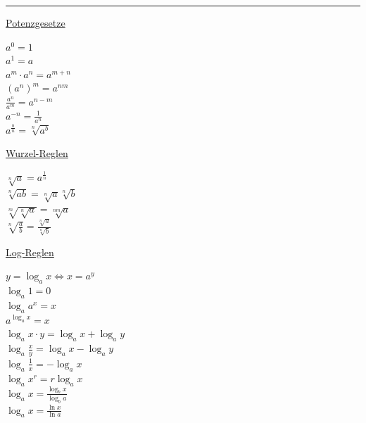 \documentclass[6pt]{article}
\begin{document}
\begin{multicols*}{2}
	\vspace{3mm}
  	\noindent\textcolor{gray}{\rule{14cm}{0.1pt}}
	\vspace{-4mm}
	
\begin{multicols*}{3}
\underline{Potenzgesetze}\vspace{2mm}\\
\begin{doublespace} 		
		$a^0  = 1$ \\
		$a^1  = a$ \\
		$a^m \cdot a^n  = a^{m+n}$ \\
		$(a^n)^m  = a^{nm}$ \\
		$\frac{a^n}{a^m}  = a^{n-m}$ \\
		$a^{-n}  = \frac{1}{a^n}$ \\
		$a^{\frac{b}{n}}  = \sqrt[n]	{a^b}$ \\
\end{doublespace}

\columnbreak

\underline{Wurzel-Reglen}\vspace{2mm}\\
\begin{doublespace}
	$\sqrt[n]{a} = a^\frac{1}{n}$ \\
	$\sqrt[n]{ab} = \sqrt[n]{a} \sqrt[n]{b}$ \\
	$\sqrt[m]{\sqrt[n]{a}} = \sqrt[nm]{a}$ \\
	$\sqrt[n]{\frac{a}{b}} = \frac{\sqrt[n]{a}}{\sqrt[n]{b}}$ \\	
\end{doublespace}


\columnbreak
\underline{Log-Reglen} \vspace{2mm}\\
\begin{doublespace}
	$y = \log_a x \Leftrightarrow x = a^y$         \\
	$\log_a 1 = 0$ \\
	$\log_a a^x = x$ \\
	$a^{\log_a x} = x $ \\
	$\log_a x \cdot y = \log_a x + \log_a y$ \\
	$\log_a \frac{x}{y} = \log_a x - \log_a y$ \\
	$\log_a \frac{1}{x} = - \log_a x$ \\
	$\log_a x^r = r \log_a x$ \\
	$\log_a x = \frac{\log_b x}{\log_b a}$ \\
	$\log_a x = \frac{\ln x}{\ln a}$ \\
\end{doublespace}



\end{multicols*}
\end{multicols*}
\end{document}
